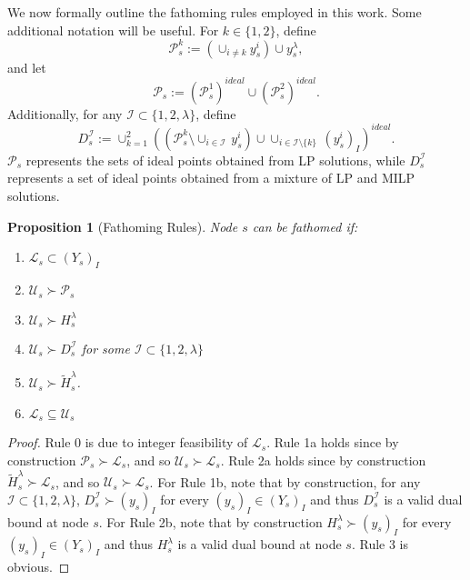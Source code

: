 \documentclass[11.5pt]{article}
\newtheorem{prop}{Proposition}
\newcommand{\dom}{\succ}
\newcommand{\U}{\mathcal{U}}
\renewcommand{\L}{\mathcal{L}}
\begin{document}
We now formally outline the fathoming rules employed in this work. Some additional notation will be useful. For $k \in \{1,2\}$, define 
\begin{equation}
\mathcal{P}^k_s := \left(\cup_{i \neq k} {y}^i_s\right) \cup {y}^\lambda_s,
\end{equation} 
and let 
\begin{equation}
\mathcal{P}_s := (\mathcal{P}^1_s)^{ideal} \cup (\mathcal{P}^2_s)^{ideal}.
\end{equation} 
Additionally, for any $\mathcal{I} \subset \{1,2,\lambda\}$, define 
\begin{equation}
D^\mathcal{I}_s:=\cup_{k=1}^{2} \left(\left(\mathcal{P}^k_s\setminus \cup_{i\in \mathcal{I}}\, {y}^i_s \right) \cup \cup_{i \in \mathcal{I}\setminus\{k\}}\, ({y}^i_s)_I\right)^{ideal}.
\end{equation}
$\mathcal{P}_s$ represents the sets of ideal points obtained from LP solutions, while  $D^\mathcal{I}_s$ represents a set of ideal points obtained from a mixture of LP and MILP solutions. 

\begin{prop}[Fathoming Rules]\label{fath0} 
Node $s$ can be fathomed if:
\begin{enumerate}
\item[0.] $\L_s \subset (Y_s)_I$
\item[1a.] $\U_s \dom \mathcal{P}_s$
\item[2a.] $\U_s \dom {H}_s^\lambda$
\item[1b.] $\U_s \dom D^\mathcal{I}_s$ for some $\mathcal{I} \subset \{1,2,\lambda\}$
\item[2b.] $\U_s \dom \tilde{H}_s^\lambda$.
\item[3.] $\L_s \subseteq \U_s$
\end{enumerate}
\end{prop}
\begin{proof}
Rule 0 is due to integer feasibility of $\L_s$. Rule 1a holds since by construction $\mathcal{P}_s \dom \L_s$, and so $\U_s \dom \L_s$. Rule 2a holds since by construction $\tilde{H}_s^\lambda \dom \L_s$, and so $\U_s \dom \L_s$. For Rule 1b, note that by construction, for any $\mathcal{I} \subset \{1,2,\lambda\}$, $D^\mathcal{I}_s \dom (y_s)_I$ for every $(y_{s})_{I} \in (Y_s)_I$ and thus $D^\mathcal{I}_s$ is a valid dual bound at node $s$. For Rule 2b, note that by construction ${H}_s^\lambda \dom (y_s)_I$ for every $(y_s)_I \in (Y_s)_I$ and thus ${H}_s^\lambda$ is a valid dual bound at node $s$. Rule 3 is obvious. 
\end{proof}
\end{document}
